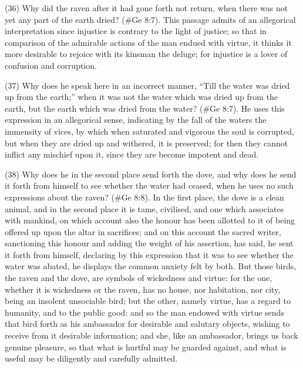 (36) Why did the raven after it had gone forth not return, when there was not yet any part of the
earth dried? (\#Ge 8:7). This passage admits of an allegorical interpretation since injustice is
contrary to the light of justice; so that in comparison of the admirable actions of the man endued
with virtue, it thinks it more desirable to rejoice with its kinsman the deluge; for injustice is a lover of
confusion and corruption.

(37) Why does he speak here in an incorrect manner, ``Till the water was dried up from the earth;''
when it was not the water which was dried up from the earth, but the earth which was dried from the
water? (\#Ge 8:7). He uses this expression in an allegorical sense, indicating by the fall of the
waters the immensity of vices, by which when saturated and vigorous the soul is corrupted, but
when they are dried up and withered, it is preserved; for then they cannot inflict any mischief upon
it, since they are become impotent and dead.

(38) Why does he in the second place send forth the dove, and why does he send it forth from
himself to see whether the water had ceased, when he uses no such expressions about the
raven? (\#Ge 8:8). In the first place, the dove is a clean animal, and in the second place it is
tame, civilised, and one which associates with mankind, on which account also the honour has
been allotted to it of being offered up upon the altar in sacrifices; and on this account the sacred
writer, sanctioning this honour and adding the weight of his assertion, has said, he sent it forth from
himself, declaring by this expression that it was to see whether the water was abated, he displays
the common anxiety felt by both. But those birds, the raven and the dove, are symbols of
wickedness and virtue: for the one, whether it is wickedness or the raven, has no house, nor
habitation, nor city, being an insolent unsociable bird; but the other, namely virtue, has a regard to
humanity, and to the public good: and so the man endowed with virtue sends that bird forth as his
ambassador for desirable and salutary objects, wishing to receive from it desirable information;
and she, like an ambassador, brings us back genuine pleasure, so that what is hurtful may be
guarded against, and what is useful may be diligently and carefully admitted.

